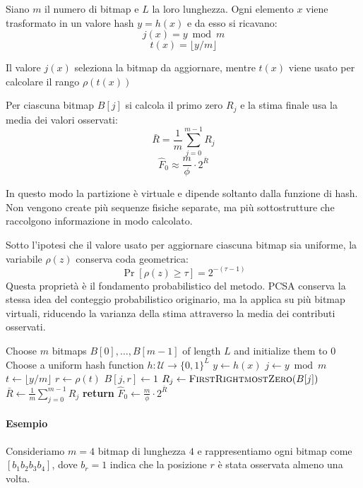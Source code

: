 \begin{definition}[PCSA]
Siano $m$ il numero di bitmap e $L$ la loro lunghezza. Ogni
elemento $x$ viene trasformato in un valore hash $y=h(x)$ e da esso si
ricavano:
\[
j(x)= y \bmod m
\]
\[
t(x)= \lfloor y/m \rfloor
\]

Il valore $j(x)$ seleziona la bitmap da aggiornare, mentre
$t(x)$ viene usato per calcolare il rango $\rho(t(x))$

Per ciascuna bitmap $B[j]$ si calcola il primo zero $R_j$ e la stima finale usa
la media dei valori osservati:
\[
\bar{R}=\frac{1}{m}\sum_{j=0}^{m-1} R_j
\]
\[
\hat{F}_0 \approx \frac{m}{\phi}\cdot 2^{\bar{R}}
\]
\end{definition}

In questo modo la partizione è virtuale e dipende soltanto dalla funzione di
hash. Non vengono create più sequenze fisiche separate, ma più sottostrutture
che raccolgono informazione in modo calcolato.

Sotto l'ipotesi che il valore usato per aggiornare ciascuna bitmap sia
uniforme, la variabile $\rho(z)$ conserva coda geometrica:
\[
\Pr[\rho(z)\ge \tau]=2^{-(\tau-1)}
\]
Questa proprietà è il fondamento probabilistico del metodo. PCSA conserva la
stessa idea del conteggio probabilistico originario, ma la applica su più
bitmap virtuali, riducendo la varianza della stima attraverso la media dei
contributi osservati.

\begin{algorithm}[htbp]
    \caption{PCSA}
    \label{alg:pcsa}
    \begin{algorithmic}
        \STATE Choose $m$ bitmaps $B[0],\dots,B[m-1]$ of length $L$ and initialize them to $0$
        \STATE Choose a uniform hash function $h:\mathcal{U}\rightarrow\{0,1\}^{L}$
            \STATE $y \leftarrow h(x)$
            \STATE $j \leftarrow y \bmod m$
            \STATE $t \leftarrow \lfloor y/m \rfloor$
            \STATE $r \leftarrow \rho(t)$
            \STATE $B[j,r]\leftarrow 1$
        \ENDFOR
            \STATE $R_j \leftarrow \textsc{FirstRightmostZero}(B[j])$
        \ENDFOR
        \STATE $\bar{R} \leftarrow \frac{1}{m}\sum_{j=0}^{m-1} R_j$
        \STATE \textbf{return} $\hat{F}_0 \leftarrow \frac{m}{\phi}\cdot 2^{\bar{R}}$
    \end{algorithmic}
\end{algorithm}

\paragraph{Esempio}
Consideriamo $m=4$ bitmap di lunghezza $4$ e rappresentiamo ogni
bitmap come $[b_1b_2b_3b_4]$, dove $b_r=1$ indica che la posizione $r$ è stata
osservata almeno una volta.

